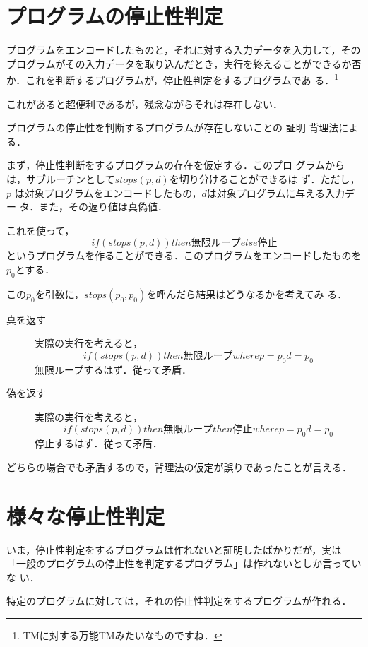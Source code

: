 \section{プログラムの停止性判定}
プログラムをエンコードしたものと，それに対する入力データを入力して，その
プログラムがその入力データを取り込んだとき，実行を終えることができるか否
か．これを判断するプログラムが，停止性判定をするプログラムであ
る．\footnote{TMに対する万能TMみたいなものですね．}

これがあると超便利であるが，残念ながらそれは存在しない．

\begin{myproof}{プログラムの停止性を判断するプログラムが存在しないことの
 証明}
背理法による．

 まず，停止性判断をするプログラムの存在を仮定する．このプロ
 グラムからは，サブルーチンとして$stops(p, d)$を切り分けることができるは
 ず．ただし，$p$
 は対象プログラムをエンコードしたもの，$d$は対象プログラムに与える入力デー
 タ．また，その返り値は真偽値．

これを使って，
 \[
  if ( stops(p,d) ) then 無限ループ else 停止
 \]
というプログラムを作ることができる．このプログラムをエンコードしたものを
 $p_0$とする．

この$p_0$を引数に，$stops(p_0, p_0)$を呼んだら結果はどうなるかを考えてみ
 る．

\begin{description}

 \item[真を返す] 実際の実行を考えると，
            \[
            if (stops(p, d)) then 無限ループ   where p = p_0 d = p_0
            \]
            無限ループするはず．従って矛盾．
 \item[偽を返す] 実際の実行を考えると，
            \[
            if (stops(p, d)) then 無限ループ then 停止  where p = p_0 d = p_0
            \]
            停止するはず．従って矛盾．
\end{description}
どちらの場合でも矛盾するので，背理法の仮定が誤りであったことが言える．
\end{myproof}


\section{様々な停止性判定}
いま，停止性判定をするプログラムは作れないと証明したばかりだが，実は
「一般のプログラムの停止性を判定するプログラム」は作れないとしか言っていな
い．

特定のプログラムに対しては，それの停止性判定をするプログラムが作れる．

